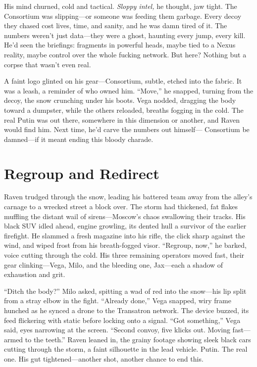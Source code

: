 \documentclass[12pt]{book}
\begin{document}
His mind churned, cold and tactical. \textit{Sloppy intel,} he thought, jaw tight. The Consortium was slipping—or someone was feeding them garbage. Every decoy they chased cost lives, time, and sanity, and he was damn tired of it. The numbers weren’t just data—they were a ghost, haunting every jump, every kill. He’d seen the briefings: fragments in powerful heads, maybe tied to a Nexus reality, maybe control over the whole fucking network. But here? Nothing but a corpse that wasn’t even real.

A faint logo glinted on his gear—Consortium, subtle, etched into the fabric. It was a leash, a reminder of who owned him. “Move,” he snapped, turning from the decoy, the snow crunching under his boots. Vega nodded, dragging the body toward a dumpster, while the others reloaded, breaths fogging in the cold. The real Putin was out there, somewhere in this dimension or another, and Raven would find him. Next time, he’d carve the numbers out himself— Consortium be damned—if it meant ending this bloody charade.

\section{Regroup and Redirect}

Raven trudged through the snow, leading his battered team away from the alley’s carnage to a wrecked street a block over. The storm had thickened, fat flakes muffling the distant wail of sirens—Moscow’s chaos swallowing their tracks. His black SUV idled ahead, engine growling, its dented hull a survivor of the earlier firefight. He slammed a fresh magazine into his rifle, the click sharp against the wind, and wiped frost from his breath-fogged visor. “Regroup, now,” he barked, voice cutting through the cold. His three remaining operators moved fast, their gear clinking—Vega, Milo, and the bleeding one, Jax—each a shadow of exhaustion and grit.

“Ditch the body?” Milo asked, spitting a wad of red into the snow—his lip split from a stray elbow in the fight. “Already done,” Vega snapped, wiry frame hunched as he synced a drone to the Transatron network. The device buzzed, its feed flickering with static before locking onto a signal. “Got something,” Vega said, eyes narrowing at the screen. “Second convoy, five klicks out. Moving fast—armed to the teeth.” Raven leaned in, the grainy footage showing sleek black cars cutting through the storm, a faint silhouette in the lead vehicle. Putin. The real one. His gut tightened—another shot, another chance to end this.
\end{document}

